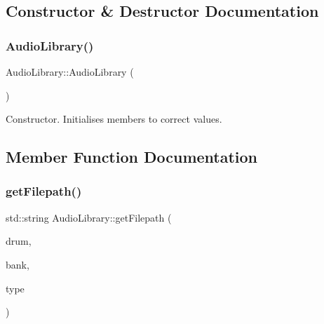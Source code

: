 \subsection{Constructor \& Destructor Documentation}
\mbox{\label{classdrumpi_1_1audio_1_1AudioLibrary_a5cb11b64bbaaaa6ce88802b9bc755124}} 
\subsubsection{\texorpdfstring{Audio\+Library()}{AudioLibrary()}}
{\footnotesize\ttfamily Audio\+Library\+::\+Audio\+Library (\begin{DoxyParamCaption}{ }\end{DoxyParamCaption})}

Constructor. Initialises members to correct values. 

\subsection{Member Function Documentation}
\mbox{\label{classdrumpi_1_1audio_1_1AudioLibrary_aee472542d978644160d578e0f9d51ded}} 
\subsubsection{\texorpdfstring{get\+Filepath()}{getFilepath()}}
{\footnotesize\ttfamily std\+::string Audio\+Library\+::get\+Filepath (\begin{DoxyParamCaption}\item[{\hyperlink{namespacedrumpi_a3897274035c1b939a604438abe648b1b}{drum\+I\+D\+\_\+t}}]{drum,  }\item[{int}]{bank,  }\item[{\hyperlink{namespacedrumpi_1_1audio_a997f55e8a5b5348cf74dbedb7abe8a59}{sample\+Source\+Type\+\_\+t}}]{type }\end{DoxyParamCaption})}


